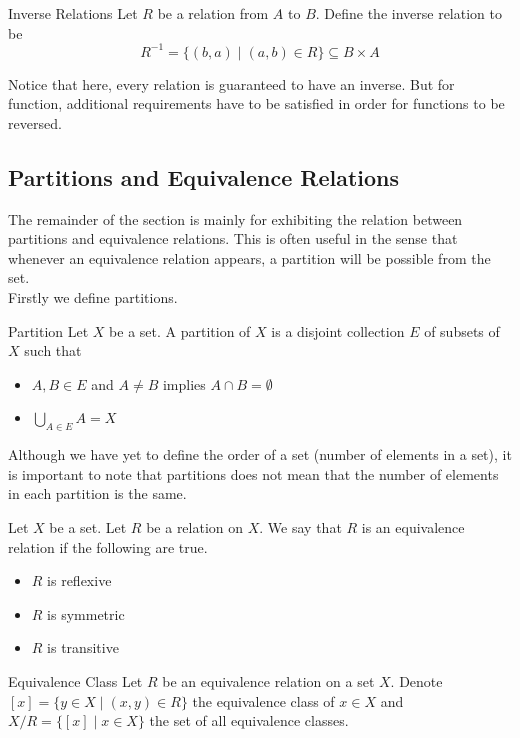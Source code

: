 \documentclass[a4paper]{article}
\begin{document}
\begin{defn}{Inverse Relations}{} Let $R$ be a relation from $A$ to $B$. Define the inverse relation to be $$R^{-1}=\{(b,a)\;|\;(a,b)\in R\}\subseteq B\times A$$
\end{defn}

Notice that here, every relation is guaranteed to have an inverse. But for function, additional requirements have to be satisfied in order for functions to be reversed. \\

\subsection{Partitions and Equivalence Relations}
The remainder of the section is mainly for exhibiting the relation between partitions and equivalence relations. This is often useful in the sense that whenever an equivalence relation appears, a partition will be possible from the set. \\
Firstly we define partitions. 

\begin{defn}{Partition}{} Let $X$ be a set. A partition of $X$ is a disjoint collection $E$ of subsets of $X$ such that
\begin{itemize}
\item $A,B\in E$ and $A\neq B$ implies $A\cap B=\emptyset$
\item $\bigcup_{A\in E}A=X$
\end{itemize}
\end{defn}

Although we have yet to define the order of a set (number of elements in a set), it is important to note that partitions does not mean that the number of elements in each partition is the same. 

\begin{defn}{}{} Let $X$ be a set. Let $R$ be a relation on $X$. We say that $R$ is an equivalence relation if the following are true. 
\begin{itemize}
\item $R$ is reflexive
\item $R$ is symmetric
\item $R$ is transitive
\end{itemize}
\end{defn}

\begin{defn}{Equivalence Class}{} Let $R$ be an equivalence relation on a set $X$. Denote $[x]=\{y\in X\;|\;(x,y)\in R\}$ the equivalence class of $x\in X$ and $X/R=\{[x]\;|\;x\in X\}$ the set of all equivalence classes. 
\end{defn}
\end{document}
